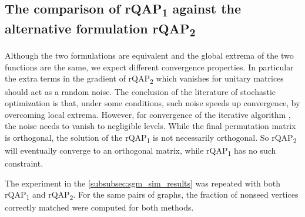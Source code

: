 \documentclass[12pt,oneside,final]{thesis}
\begin{document}
\subsection{The comparison of rQAP\textsubscript{1} against the alternative formulation rQAP\textsubscript{2}}
Although the two formulations are equivalent and the global extrema of the two functions are the same, we expect different convergence  properties. In particular the extra terms in the gradient of rQAP\textsubscript{2} which vanishes for unitary matrices should act as a random noise. The conclusion of the literature of stochastic optimization  is that, under some conditions, such noise speeds up convergence, by overcoming local extrema. However, for convergence of the iterative algorithm , the noise needs to vanish to negligible levels. While the final permutation matrix is orthogonal, the solution of the rQAP\textsubscript{1} is not necessarily orthogonal. So rQAP\textsubscript{2}  will eventually converge to an orthogonal matrix, while rQAP\textsubscript{1}   has no such constraint.

The experiment in the \autoref{subsubsec:sgm_sim_results} was repeated with both rQAP\textsubscript{1} and rQAP\textsubscript{2}. For the same pairs of graphs,  the fraction of nonseed vertices correctly matched were computed for both methods.
\end{document}
